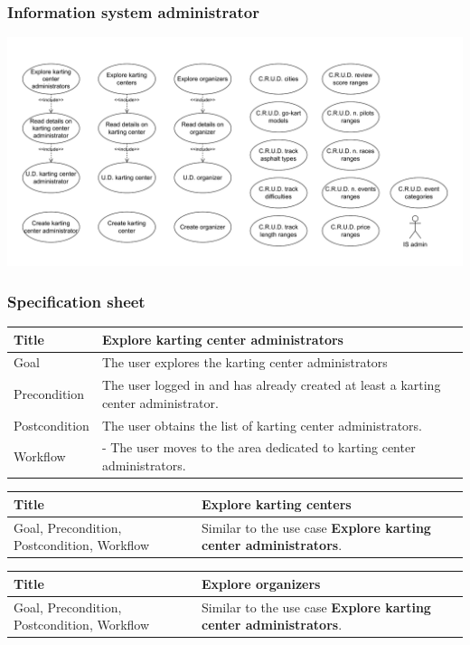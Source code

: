 \documentclass{beamer}
\begin{document}
\begin{frame}
    \frametitle{Information system administrator}
    \centering
    \includegraphics[width=0.7\linewidth]{drawio/is-admin.pdf}
\end{frame}

\begin{frame}
    \frametitle{Specification sheet}
    \begin{table}
        \tiny
        \begin{tabular}{|p{2cm}|p{6cm}|}
        \hline  
        Title & \textbf{Explore karting center administrators} \\
        \hline
        Goal & The user explores the karting center administrators \\
        \hline
        Precondition & The user logged in and has already created at least a karting center 
        administrator. \\
        \hline
        Postcondition & The user obtains the list of karting center administrators. \\
        \hline
        Workflow &
        - The user moves to the area dedicated to karting center administrators. \\
        \hline
        \end{tabular}
\end{table}

\begin{table}
    \tiny
    \begin{tabular}{|p{2cm}|p{6cm}|}
    \hline  
    Title & \textbf{Explore karting centers} \\
    \hline
    Goal, Precondition, Postcondition, Workflow & Similar 
    to the use case \textbf{Explore karting center administrators}. \\
    \hline
    \end{tabular}
\end{table}

\begin{table}
    \tiny
    \begin{tabular}{|p{2cm}|p{6cm}|}
    \hline  
    Title & \textbf{Explore organizers} \\
    \hline
    Goal, Precondition, Postcondition, Workflow & Similar 
    to the use case \textbf{Explore karting center administrators}. \\
    \hline
    \end{tabular}
\end{table}
\end{frame}
\end{document}
